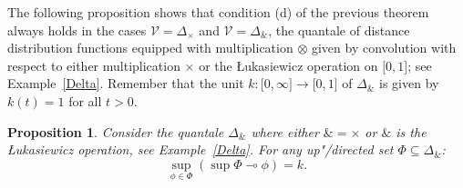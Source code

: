 \documentclass[preprint, a4paper]{elsarticle}
\newcommand{\dashcirc}{\multimap}
\newtheorem{proposition}[theorem]{Proposition}
\theoremstyle{definition}
\theoremstyle{remark}
\providecommand{\exref}[1]{Example~\ref{#1}}
\providecommand{\tens}{\otimes}
\providecommand{\brks}[1]{\lbrack #1 \rbrack}
\newcommand{\tn}{\mathbin\&}
\providecommand{\map}[3]{#1\colon#2\to#3}
\providecommand{\catvar}[1]{\mathcal{#1}}
\providecommand{\2}{\mathsf 2}
\providecommand{\V}{\catvar V}
\begin{document}
	The following proposition shows that condition (d) of the previous theorem always holds in the cases $\V = \Delta_\times$ and $\V = \Delta_{\tn}$, the quantale of distance distribution functions equipped with multiplication $\tens$ given by convolution with respect to either multiplication $\times$ or the \L ukasiewicz operation on $\brks{0,1}$; see \exref{Delta}. Remember that the unit $\map k{\brks{0, \infty}}{\brks{0, 1}}$ of $\Delta_{\tn}$ is given by $k(t) = 1$ for all $t > 0$.
	\begin{proposition} \label{condition d for Delta}
		Consider the quantale $\Delta_{\tn}$ where either $\tn = \times$ or $\tn$ is the \L ukasiewicz operation, see \exref{Delta}. For any up"/directed set $\Phi \subseteq \Delta_{\tn}$:
		\begin{displaymath}
			\sup_{\phi \in \Phi} (\sup \Phi \dashcirc \phi) = k.
		\end{displaymath}
	\end{proposition}
\end{document}
